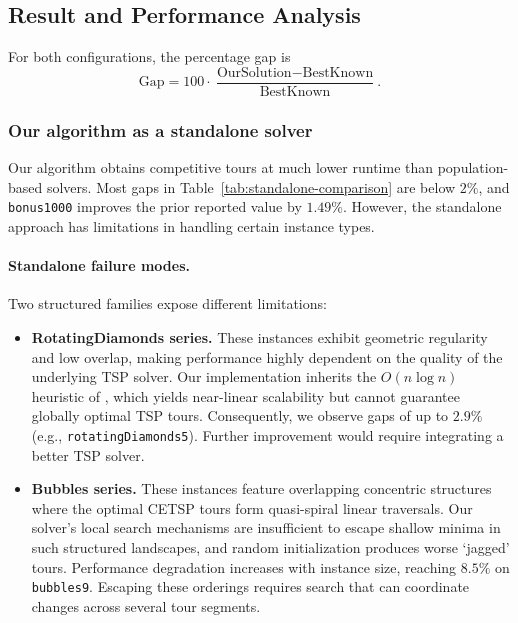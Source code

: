 \documentclass[11pt]{article}
\begin{document}
\subsection{Result and Performance Analysis}
For both configurations, the percentage gap is
\[\text{Gap} = 100 \cdot \frac{\text{OurSolution} - \text{BestKnown}}{\text{BestKnown}}.\]

\subsubsection{Our algorithm as a standalone solver}

Our algorithm obtains competitive tours at much lower runtime than population-based solvers. Most gaps in Table~\ref{tab:standalone-comparison} are below $2\%$, and \texttt{bonus1000} improves the prior reported value by $1.49\%$. However, the standalone approach has limitations in handling certain instance types.

\paragraph{Standalone failure modes.}
Two structured families expose different limitations:
\begin{itemize}
  \item \textbf{RotatingDiamonds series.}
  These instances exhibit geometric regularity and low overlap, making performance highly dependent on the quality of the underlying TSP solver.
  Our implementation inherits the \(O(n \log n)\) heuristic of \textcite{Formella2024}, which yields near-linear scalability but cannot guarantee globally optimal TSP tours.
  Consequently, we observe gaps of up to $2.9\%$ (e.g., \texttt{rotatingDiamonds5}).
  Further improvement would require integrating a better TSP solver.
  \item \textbf{Bubbles series.}
  These instances feature overlapping concentric structures where the optimal CETSP tours form quasi-spiral linear traversals.
  Our solver's local search mechanisms are insufficient to escape shallow minima in such structured landscapes, and random initialization produces worse `jagged' tours.
  Performance degradation increases with instance size, reaching $8.5\%$ on \texttt{bubbles9}.
  Escaping these orderings requires search that can coordinate changes across several tour segments.
\end{itemize}
\end{document}
